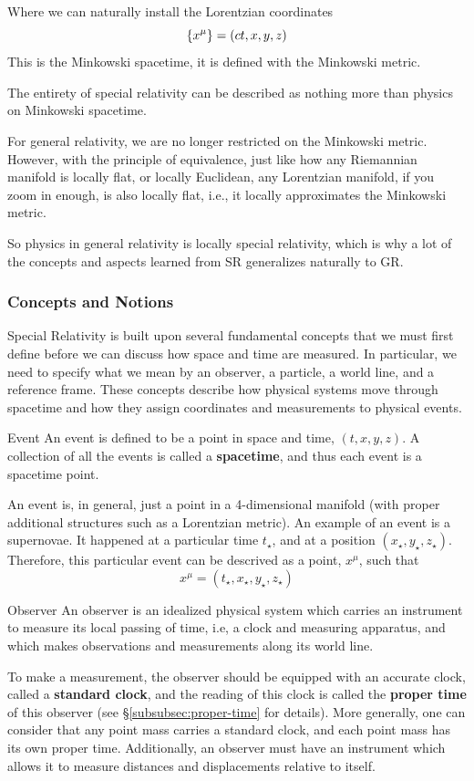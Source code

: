 		Where we can naturally install the Lorentzian coordinates
		\[
			\qty{
				x^\mu
			}
			=
			(ct,x,y,z)
		\]
		This is the Minkowski spacetime, it is defined with the Minkowski metric.

		The entirety of special relativity can be described as nothing 
		more than physics on Minkowski spacetime.

		For general relativity, we are no longer restricted on the Minkowski metric.
		However, with the principle of equivalence, just like how any Riemannian manifold is locally flat, or locally Euclidean, any Lorentzian manifold, if you zoom in enough,
		is also locally flat, i.e., it locally approximates the Minkowski metric.
		
		So physics in general relativity is locally special relativity, which
		is why a lot of the concepts and aspects learned from SR generalizes naturally to GR.
		\newpage

	\subsubsection{Concepts and Notions}
		
		Special Relativity is built upon several fundamental concepts that
		we must first define before we can discuss how space and time are
		measured. In particular, we need to specify what we mean by an
		observer, a particle, a world line, and a reference frame. These
		concepts describe how physical systems move through spacetime and
		how they assign coordinates and measurements to physical events.

		\begin{definition}{Event}
			An event is defined to be a point in
			space and time, $(t,x,y,z)$. A collection
			of all the events is called a \textbf{spacetime},
			and thus each event is a spacetime point.
		\end{definition}

		An event is, in general, just a point in a 4-dimensional
		manifold (with proper additional structures such as a Lorentzian metric).
		An example of an event is a supernovae. It happened at a particular
		time $t_\star$, and at a position $(x_\star,y_\star, z_\star)$.
		Therefore, this particular event can be descrived as a point, $x^\mu$,
		such that
		\[
			x^\mu = (t_\star, x_\star, y_\star, z_\star)
		\]
			
		\begin{definition}{Observer}
			An observer is an idealized physical system which carries an
			instrument to measure its local passing of time, i.e, a clock
			and measuring apparatus, and which makes observations and
			measurements along its world line.
		\end{definition}
		To make a measurement, the observer should
		be equipped with an accurate clock, called a \textbf{standard clock}, and the reading of this
		clock is called the \textbf{proper time} of this observer (see \S\ref{subsubsec:proper-time} for details). More
		generally, one can consider that any point mass carries a standard clock, and each
		point mass has its own proper time. Additionally, an observer must 
		have an instrument which allows it to measure distances and displacements relative
		to itself.

